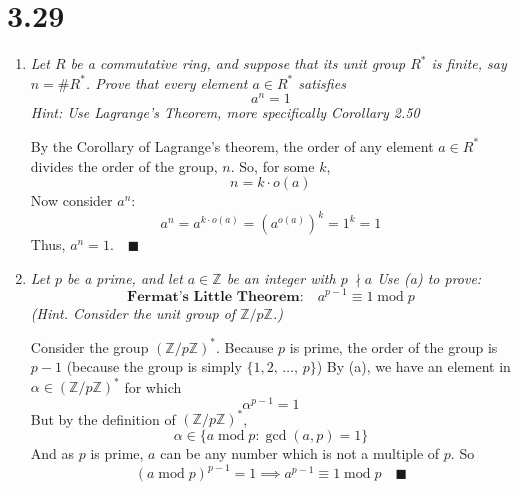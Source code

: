 \documentclass[12pt]{article}
\newcommand{\Z}{\mathbb{Z}}
\newcommand{\qed}{\quad \blacksquare}
\renewcommand{\mod}{\; \text{mod}\; }
\begin{document}
\section*{3.29} 
    \begin{enumerate}[label=(\alph*)]
        \item \emph{Let $R$ be a commutative ring, and suppose that its unit group $R^*$ is finite, say $n = \#R^*$. Prove that every element $a \in R^*$ satisfies} 
        \[a^n  =1\]
        \emph{Hint: Use Lagrange's Theorem, more specifically Corollary 2.50}

        \color{blue}
            By the Corollary of Lagrange's theorem, the order of any element $a \in R^*$ divides the order of the group, $n$. So, for some $k$,
            \[n = k\cdot o(a)\]
            Now consider $a^n$: 
            \[a^{n} = a^{k\cdot o(a)} = (a^{o(a)})^k = 1^k = 1\]
            Thus, $a^n = 1. \qed$
        \color{black}

        \item \emph{Let $p$ be a prime, and let $a \in \Z$ be an integer with $p\; \nmid a$ Use (a) to prove:}
        \[\textbf{Fermat's Little Theorem:} \quad a^{p-1} \equiv 1 \mod p\] 
        \emph{(Hint. Consider the unit group of $\Z/p\Z$.)}

        \color{blue}
            Consider the group $(\Z/p\Z)^*$. Because $p$ is prime, the order of the group is $p - 1$ (because the group is simply $\{1, 2,\, \dots,\, p\}$) By (a), we have an element in $\alpha \in (\Z/p\Z)^*$ for which 
            \[\alpha^{p-1} = 1\]
            But by the definition of $(\Z/p\Z)^*$, 
            \[\alpha \in \{a \mod p: \gcd(a, p) = 1\}\] 
            And as $p$ is prime, $a$ can be any number which is not a multiple of $p$. So 
            \[(a \mod p)^{p-1} = 1 \implies a^{p - 1} \equiv 1 \mod p \qed\]
        \color{black}
    \end{enumerate}
\pagebreak
\end{document}
